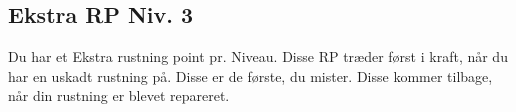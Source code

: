 \subsection*{Ekstra RP Niv. 3}
Du har et Ekstra rustning point pr. Niveau. Disse RP træder først i kraft, når du har en uskadt rustning på. Disse er de første, du mister. Disse kommer tilbage, når din rustning er blevet repareret.\\